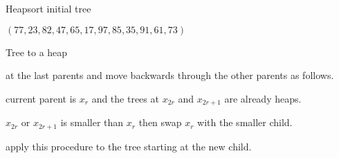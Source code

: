 \begin{frame}[fragile]{Heapsort initial tree}
  \begin{center}
    $(77,23,82,47,65,17,97,85,35,91,61,73)$ \\[1cm]
  \end{center}
\end{frame}


\begin{frame}{Tree to a heap}
  \begin{description}
    \setlength\itemsep{4mm}
    \item[Start] at the last parents and move backwards through the other parents as follows.
    \item[Suppose] current parent is $x_r$ and the trees at $x_{2r}$ and $x_{2r+1}$ are already heaps.
    \item[If] $x_{2r}$ or $x_{2r+1}$ is smaller than $x_r$ then swap $x_r$ with the smaller child.
    \item[If necessary] apply this procedure to the tree starting at the new child.
  \end{description}
\end{frame}


